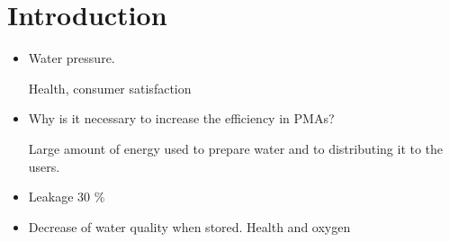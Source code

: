 \chapter{Introduction}

 
\begin{itemize}
\item Water pressure. 

Health, consumer satisfaction
\item Why is it necessary to increase the efficiency in PMAs?

Large amount of energy used to prepare water and to distributing it to the users. 
\item Leakage 30 \%
\item Decrease of water quality when stored.
Health and oxygen 
\end{itemize}